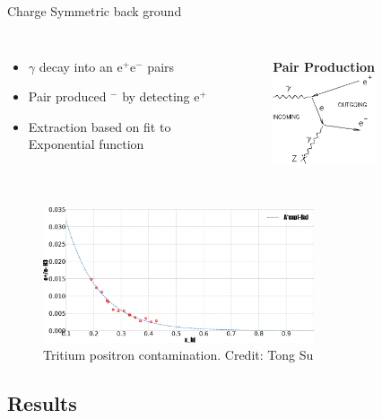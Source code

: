 \documentclass{beamer}
\begin{document}
\begin{frame}{Charge Symmetric back ground}
\vspace{-0pt}

	\begin{columns}
		\vspace*{-0.75cm}
		\begin{itemize}
			\item $\gamma$ decay into an e$^+$e$^-$ pairs
			\item  Pair produced $^-$ by detecting e$^+$
			\item Extraction based on fit to Exponential function 
		\end{itemize}
		\vspace{-40pt}
		\begin{figure}
			\textbf{Pair Production}
			\includegraphics[width=3.0cm]{../images/pp_FD.png}
		\end{figure}
	\end{columns}
	

	\begin{figure}
			\caption*{Tritium positron contamination. Credit: Tong Su}
			\includegraphics[width=8.0cm]{../images/positron_H3_bane.pdf}
	\end{figure}
		

	

\end{frame}
\subsection[Results]{Results}
\end{document}
